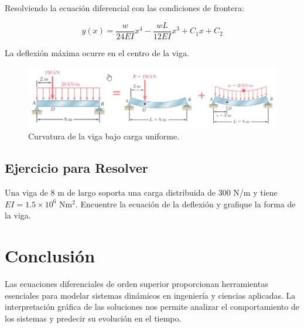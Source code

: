 Resolviendo la ecuación diferencial con las condiciones de frontera:

\begin{equation}
y(x) = \frac{w}{24EI} x^4 - \frac{wL}{12EI} x^3 + C_1 x + C_2
\end{equation}

La deflexión máxima ocurre en el centro de la viga.


\begin{figure}[H]
    \centering
    \includegraphics[width=0.5\linewidth]{images/Modelado 08.png}
    \caption{Curvatura de la viga bajo carga uniforme.}
    \label{fig:enter-label}
\end{figure}

\subsection*{Ejercicio para Resolver}
Una viga de 8 m de largo soporta una carga distribuida de 300 N/m y tiene \( EI = 1.5 \times 10^6 \) Nm\(^2\). Encuentre la ecuación de la deflexión y grafique la forma de la viga.

\section{Conclusión}
Las ecuaciones diferenciales de orden superior proporcionan herramientas esenciales para modelar sistemas dinámicos en ingeniería y ciencias aplicadas. La interpretación gráfica de las soluciones nos permite analizar el comportamiento de los sistemas y predecir su evolución en el tiempo.

